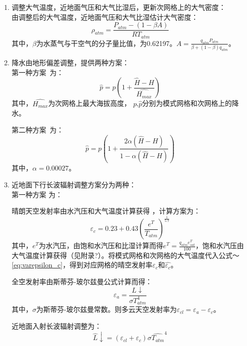 \begin{enumerate}
\item  调整大气温度，近地面气压和大气比湿后，更新次网格上的大气密度：\\

由调整后的大气温度，近地面气压和大气比湿估计大气密度：
\begin{equation}
\rho_{atm}=\frac{P_{atm}-(1-\beta A)}{R T_{atm}}
\end{equation}
其中，$\beta$为水蒸气与干空气的分子量比值，为0.62197。$A=\frac{q_{atm} P_{atm}}{\beta +(1-\beta)q_{atm}}$。

\item  降水由地形偏差调整，提供两种方案：\\

第一种方案~\citep{Tesfa2020}为：
\begin{equation}
\hat{p}=p \left({1+\frac{\hat{H}-H}{\hat{H_{max}}}}\right)
\end{equation}
其中，$\hat{H_{max}}$为次网格上最大海拔高度，
$p$,$\hat{p}$分别为模式网格和次网格上的降水。

第二种方案~\citep{liston2006distributed}为：
\begin{equation}
\hat{p}=p \left(1+\frac{2 \alpha \left(\hat{H}-H\right)}{1- \alpha \left(\hat{H}-H\right)}\right)
\end{equation}
其中，$\alpha=0.00027$。

\item 近地面下行长波辐射调整方案分为两种：\\

第一种方案 \citep{fiddes2014toposcale} 为：

晴朗天空发射率由水汽压和大气温度计算获得 \citep{konzelmann1994parameterization}，计算方案为：
\begin{equation}\label{eq:varepsilon_c}
\varepsilon_{c}=0.23+0.43 \left(\frac{e^{T}}{T_{atm}}\right)^ \frac{1}{5.7}
\end{equation}
其中，$e^{T}$为水汽压，由饱和水汽压和比湿计算而得$e^{T}= \frac{q_{atm} e_{sat}^{T}}{100}$，饱和水汽压由大气温度计算获得（见附录?）。将模式网格和次网格的大气温度代入公式～\ref{eq:varepsilon_c}，得到对应网格的晴空发射率$\varepsilon_c$和$\hat{\varepsilon_{c}}$。

全空发射率由斯蒂芬-玻尔兹曼公式计算而得：
\begin{equation}
\varepsilon_{a}=\frac{L↓}{\sigma T_{atm}^4}
\end{equation}
其中，$\sigma$为斯蒂芬-玻尔兹曼常数。则多云天空发射率为$\varepsilon_{cl}=\varepsilon_{a}-\varepsilon_{c}$。

近地面入射长波辐射调整为：
\begin{equation}
\hat{L}↓=\left(\varepsilon_{cl}+\varepsilon_{c}\right) \sigma \hat{T_{atm}}^4
\end{equation}


\end{enumerate}
